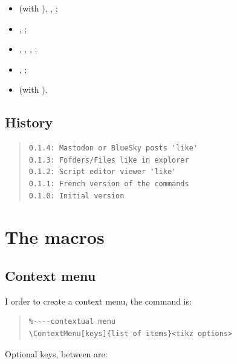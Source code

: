 \documentclass[11pt,a4paper]{ltxdoc}
\begin{document}
\begin{itemize}
	\item {} (with ), , ;
	\item {}, ;
	\item {}, , , ;
	\item {}, ;
	\item {} (with ).
\end{itemize}

\vfill

\subsection{History}

\begin{quote}
\begin{verbatim}
0.1.4: Mastodon or BlueSky posts 'like'
0.1.3: Fofders/Files like in explorer
0.1.2: Script editor viewer 'like'
0.1.1: French version of the commands
0.1.0: Initial version
\end{verbatim}
\end{quote}

\pagebreak

\section{The macros}

\subsection{Context menu}

I order to create a context menu, the command is:

\begin{quote}
\begin{verbatim}
%----contextual menu
\ContextMenu[keys]{list of items}<tikz options>
\end{verbatim}
\end{quote}

Optional keys, between \MontreCode{[...]} are:
\end{document}
